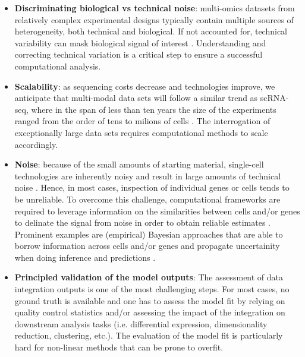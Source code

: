 \begin{itemize}
	\item \textbf{Discriminating biological vs technical noise}: multi-omics datasets from relatively complex experimental designs typically contain multiple sources of heterogeneity, both technical and biological. If not accounted for, technical variability can mask biological signal of interest \cite{Buettner2015}. Understanding and correcting technical variation is a critical step to ensure a successful computational analysis.

	\item \textbf{Scalability}: as sequencing costs decrease and technologies improve, we anticipate that multi-modal data sets will follow a similar trend as scRNA-seq, where in the span of less than ten years the size of the experiments ranged from the order of tens to milions of cells \cite{Svensson2018}. The interrogation of exceptionally large data sets requires computational methods to scale accordingly.

	\item \textbf{Noise}: because of the small amounts of starting material, single-cell technologies are inherently noisy and result in large amounts of technical noise \cite{Stegle2015}. Hence, in most cases, inspection of individual genes or cells tends to be unreliable. To overcome this challenge, computational frameworks are required to leverage information on the similarities between cells and/or genes to delinate the signal from noise in order to obtain reliable estimates \cite{Vallejos2015}. Prominent examples are (empirical) Bayesian approaches that are able to borrow information across cells and/or genes and propagate uncertainity when doing inference and predictions \cite{Kharchenko2014}.


	\item \textbf{Principled validation of the model outputs}: The assessment of data integration outputs is one of the most challenging steps. For most cases, no ground truth is available and one has to assess the model fit by relying on quality control statistics and/or assessing the impact of the integration on downstream analysis tasks (i.e. differential expression, dimensionality reduction, clustering, etc.). The evaluation of the model fit is particularly hard for non-linear methods that can be prone to overfit. 

\end{itemize}

